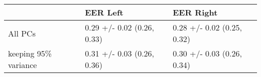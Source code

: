 \begin{tabular}{lll}
\toprule
{} &                    EER Left &                   EER Right \\
\midrule
All PCs              &  0.29 +/- 0.02 (0.26, 0.33) &  0.28 +/- 0.02 (0.25, 0.32) \\
keeping 95\% variance &  0.31 +/- 0.03 (0.26, 0.36) &  0.30 +/- 0.03 (0.26, 0.34) \\
\bottomrule
\end{tabular}
